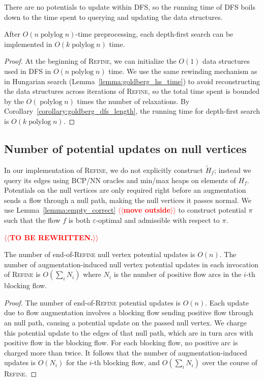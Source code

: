 \documentclass[a4paper,UKenglish]{socg-lipics-v2018}
\makeatletter
\def\note#1{\textcolor{red}{{#1}}}
\def\polylog{\mathop{\mathrm{polylog}}}
\def\eps{\varepsilon}
\theoremstyle{plain}
\numberwithin{figure}{section}
\def\n@te#1{\textsf{\boldmath \textbf{$\langle\!\langle$#1$\rangle\!\rangle$}}\leavevmode}
\def\note#1{\textcolor{red}{\n@te{#1}}}
\makeatother
\begin{document}
There are no potentials to update within \textsc{DFS}, so the running time of
\textsc{DFS} boils down to the time spent to querying and updating the data
structures.

\begin{lemmarep}
\label{lemma:goldberg_dfs_time}
After $O(n \polylog n)$-time preprocessing,
each depth-first search can be implemented in $O(k \polylog n)$ time.
\end{lemmarep}

\begin{proof}
At the beginning of \textsc{Refine}, we can initialize the $O(1)$ data
structures used in \textsc{DFS} in $O(n\polylog n)$ time.
We use the same rewinding mechanism as in Hungarian search
(Lemma~\ref{lemma:goldberg_hs_time}) to avoid reconstructing the data
structures across iterations of \textsc{Refine}, so the total time spent
is bounded by the $O(\polylog n)$ times the number of relaxations.
By Corollary~\ref{corollary:goldberg_dfs_length}, the running time for depth-first search is $O(k\polylog n)$.
\end{proof}

\subsection{Number of potential updates on null vertices}

In our implementation of \textsc{Refine}, we do not explicitly construct $\tilde{H}_f$; instead we query its edges using BCP/NN
oracles and min/max heaps on elements of $H_f$.
Potentials on the null vertices are only required right before an augmentation sends a flow through a
null path, making the null vertices it passes normal.
We use Lemma~\ref{lemma:empty_correct} \note{move outside}
to construct potential $\pi$ such that the flow $f$ is both $\eps$-optimal and admissible with respect to $\pi$.

\note{TO BE REWRITTEN.}

\begin{lemmarep}
\label{lemma:empty_updates}
The number of end-of-\textsc{Refine} null vertex potential updates is $O(n)$.
The number of augmentation-induced null vertex potential updates in each
invocation of \textsc{Refine} is $O(\sum_i N_i)$ where $N_i$ is the number
of positive flow arcs in the $i$-th blocking flow.
\end{lemmarep}

\begin{proof}
The number of end-of-\textsc{Refine} potential updates is $O(n)$.
Each update due to flow augmentation involves a blocking flow sending positive
flow through an null path, causing a potential update on the passed
null vertex.
We charge this potential update to the edges of that null path, which are in
turn arcs with positive flow in the blocking flow.
For each blocking flow, no positive arc is charged more than twice.
It follows that the number of augmentation-induced updates is $O(N_i)$ for the
$i$-th blocking flow, and $O(\sum_i N_i)$ over the course of \textsc{Refine}.
\end{proof}
\end{document}
